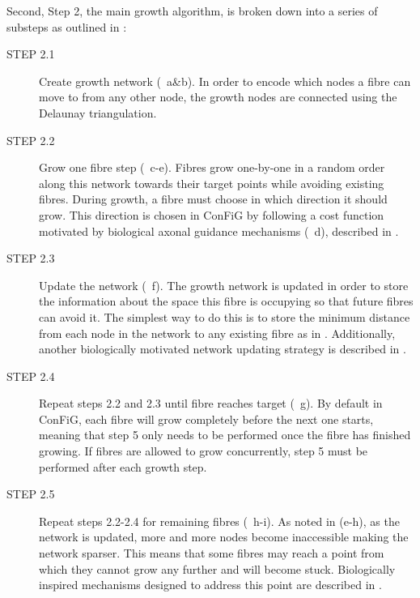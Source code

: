 Second, Step 2, the main growth algorithm, is broken down into a series of substeps as outlined in :
\begin{description}
  \item [STEP 2.1] Create growth network (~a\&b). In order to encode which nodes a fibre can move to from any other node, the growth nodes are connected using the Delaunay triangulation.

  \item [STEP 2.2] Grow one fibre step (~c-e). Fibres grow one-by-one in a random order along this network towards their target points while avoiding existing fibres. During growth, a fibre must choose in which direction it should grow. This direction is chosen in ConFiG by following a cost function motivated by biological axonal guidance mechanisms (~d), described in .

  \item [STEP 2.3] Update the network (~f). The growth network is updated in order to store the information about the space this fibre is occupying so that future fibres can avoid it. The simplest way to do this is to store the minimum distance from each node in the network to any existing fibre as in \cite{Callaghan2019}. Additionally, another biologically motivated network updating strategy is described in .

  \item [STEP 2.4] Repeat steps 2.2 and 2.3 until fibre reaches target (~g). By default in ConFiG, each fibre will grow completely before the next one starts, meaning that step 5 only needs to be performed once the fibre has finished growing. If fibres are allowed to grow concurrently, step 5 must be performed after each growth step.

  \item [STEP 2.5] Repeat steps 2.2-2.4 for remaining fibres (~h-i). As noted in  (e-h), as the network is updated, more and more nodes become inaccessible making the network sparser. This means that some fibres may reach a point from which they cannot grow any further and will become stuck. Biologically inspired mechanisms designed to address this point are described in .
\end{description}

